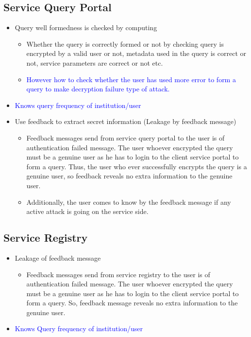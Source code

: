 \subsection{Service Query Portal}
\begin{itemize}
    \item Query well formedness is checked by computing
          \begin{itemize}
              \item Whether the query is correctly formed or not by checking query is encrypted by a valid user or not, metadata used in the query is correct or not, service parameters are correct or not etc.
              \item \textcolor{blue}{However how to check whether the user has used more error to form a query to make decryption failure type of attack.}
          \end{itemize}
    \item \textcolor{blue}{Knows query frequency of institution/user}
    \item Use feedback to extract secret information (Leakage by feedback message)
          \begin{itemize}
              \item Feedback messages send from service query portal to the user is of authentication failed message. The user whoever encrypted the query must be a genuine user as he has to login to the client service portal to form a query. Thus, the user who ever successfully encrypts the query is a genuine user, so feedback reveals no extra information to the genuine user.
              \item Additionally, the user comes to know by the feedback message if any active attack is going on the service side.
          \end{itemize}
\end{itemize}


\subsection{Service Registry}
\begin{itemize}
    \item Leakage of feedback message
          \begin{itemize}
              \item Feedback messages send from service registry to the user is of authentication failed message. The user whoever encrypted the query must be a genuine user as he has to login to the client service portal to form a query. So, feedback message reveals no extra information to the genuine user.
          \end{itemize}
    \item \textcolor{blue}{Knows Query frequency of institution/user}
\end{itemize}

